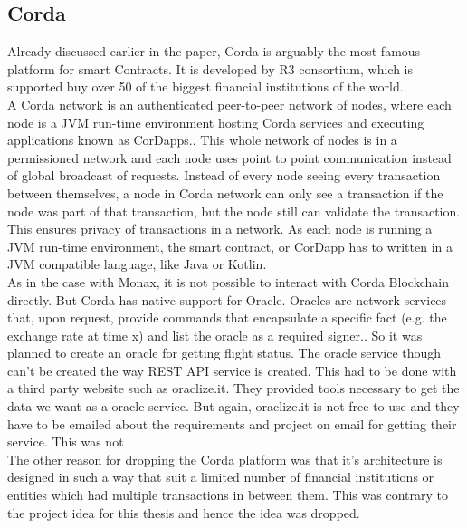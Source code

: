 \subsection{Corda}
Already discussed earlier in the paper, Corda is arguably the most famous platform for smart Contracts. It is developed by R3 consortium, which is supported buy over 50 of the biggest financial institutions of the world.
\\A Corda network is an authenticated peer-to-peer network of nodes, where each node is a JVM run-time environment hosting Corda services and executing applications known as CorDapps.\cite{Hearn2016Corda:Ledger}. This whole network of nodes is in a permissioned network and each node uses point to point communication instead of global broadcast of requests. Instead of every node seeing every transaction between themselves, a node in Corda network can only see a transaction if the node was part of that transaction, but the node still can validate the transaction. This ensures privacy of transactions in a network.
As each node is running a JVM run-time environment, the smart contract, or CorDapp has to written in a JVM compatible language, like Java or Kotlin.
\\As in the case with Monax, it is not possible to interact with Corda Blockchain directly. But Corda has native support for Oracle. Oracles are network services that, upon request, provide commands that encapsulate a specific fact (e.g. the exchange rate at time x) and list the oracle as a required signer.\cite{OraclesDocumentation}. So it was planned to create an oracle for getting flight status. The oracle service though can't be created the way REST API service is created. This had to be done with a third party website such as oraclize.it. They provided tools necessary to get the data we want as a oracle service. But again, oraclize.it is not free to use and they have to be emailed about the requirements and project on email for getting their service. This was not %
\\The other reason for dropping the Corda platform was that it's architecture is designed in such a way that suit a limited number of financial institutions or entities which had multiple transactions in between them. This was contrary to the project idea for this thesis and hence the idea was dropped.

